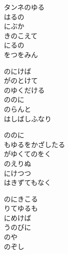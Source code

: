 \documentclass[10pt,b5j]{tarticle} %
\begin{document}
\vspace{1.5em} %
\newcommand{\linespace}{0.5em} %
\newcommand{\blocksize}{0.5\hsize} %
\begin{enumerate} %
    \begin{minipage}[c]{\blocksize}
    
        \vspace{\linespace}
        \item
        タンネのゆる\\
        はるの\\
        にぶか\\
        きのこえて\\
        にるの\\
        をつをみん
        
        \vspace{\linespace}
        \item
        のにけば\\
        がのとけて\\
        のゆくだける\\
        ののに\\
        のらんと\\
        はしばしふなり
        
        \vspace{\linespace}
        \item
        ののに\\
        もゆるをかざしたる\\
        がゆくてのをく\\
        のえりぬ\\
        にけつつ\\
        はきずてもなく
        
        \vspace{\linespace}
        \item
        のにきこる\\
        りてゆるも\\
        にめけば\\
        うのびに\\
        のや\\
        のぞし
        

\end{minipage}
\end{enumerate}
\end{document}
